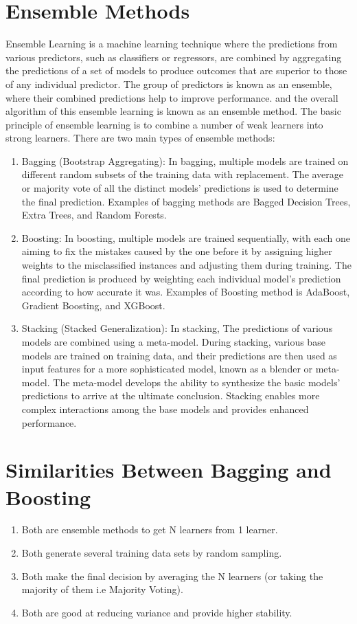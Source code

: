 \section{Ensemble Methods}
    Ensemble Learning is a machine learning technique where the predictions from various predictors, such as classifiers or regressors, are combined by aggregating the predictions of a set of models to produce outcomes that are superior to those of any individual predictor. The group of predictors is known as an ensemble, where their combined predictions help to improve performance. and the overall algorithm of this ensemble learning is known as an ensemble method. The basic principle of ensemble learning is to combine a number of weak learners into strong learners. 
    There are two main types of ensemble methods:
    \begin{enumerate}
        \item Bagging (Bootstrap Aggregating): In bagging, multiple models are trained on different random subsets of the training data with replacement. The average or majority vote of all the distinct models’ predictions is used to determine the final prediction. Examples of bagging methods are Bagged Decision Trees, Extra Trees, and Random Forests.
        \item Boosting: In boosting, multiple models are trained sequentially, with each one aiming to fix the mistakes caused by the one before it by assigning higher weights to the misclassified instances and adjusting them during training. The final prediction is produced by weighting each individual model’s prediction according to how accurate it was. Examples of Boosting method is AdaBoost, Gradient Boosting, and XGBoost.
        \item Stacking (Stacked Generalization): In stacking, The predictions of various models are combined using a meta-model. During stacking, various base models are trained on training data, and their predictions are then used as input features for a more sophisticated model,  known as a blender or meta-model. The meta-model develops the ability to synthesize the basic models’ predictions to arrive at the ultimate conclusion. Stacking enables more complex interactions among the base models and provides enhanced performance.
    \end{enumerate}

\section{Similarities Between Bagging and Boosting}
    \begin{enumerate}
        \item Both are ensemble methods to get N learners from 1 learner.
        \item Both generate several training data sets by random sampling.
        \item Both make the final decision by averaging the N learners (or taking the majority of them i.e Majority Voting).
        \item Both are good at reducing variance and provide higher stability.
    \end{enumerate}

